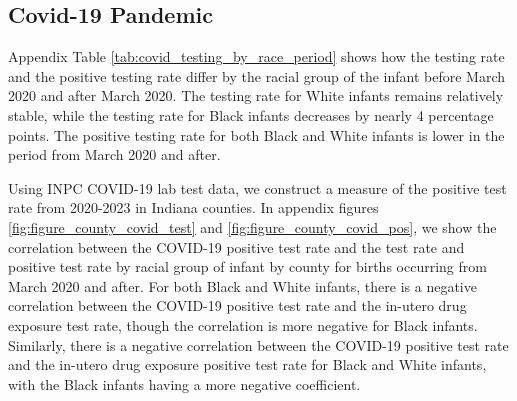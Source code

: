 \subsection*{Covid-19 Pandemic}
Appendix Table \ref{tab:covid_testing_by_race_period} shows how the testing rate and the positive testing rate differ by the racial group of the infant before March 2020 and after March 2020. The testing rate for White infants remains relatively stable, while the testing rate for Black infants decreases by nearly 4 percentage points. The positive testing rate for both Black and White infants is lower in the period from March 2020 and after. 

Using INPC COVID-19 lab test data, we construct a measure of the positive test rate from 2020-2023 in Indiana counties. In appendix figures \ref{fig:figure_county_covid_test} and \ref{fig:figure_county_covid_pos}, we show the correlation between the COVID-19 positive test rate and the test rate and positive test rate by racial group of infant by county for births occurring from March 2020 and after. For both Black and White infants, there is a negative correlation between the COVID-19 positive test rate and the in-utero drug exposure test rate, though the correlation is more negative for Black infants. Similarly, there is a negative correlation between the  COVID-19 positive test rate and the in-utero drug exposure positive test rate for Black and White infants, with the Black infants having a more negative coefficient. 